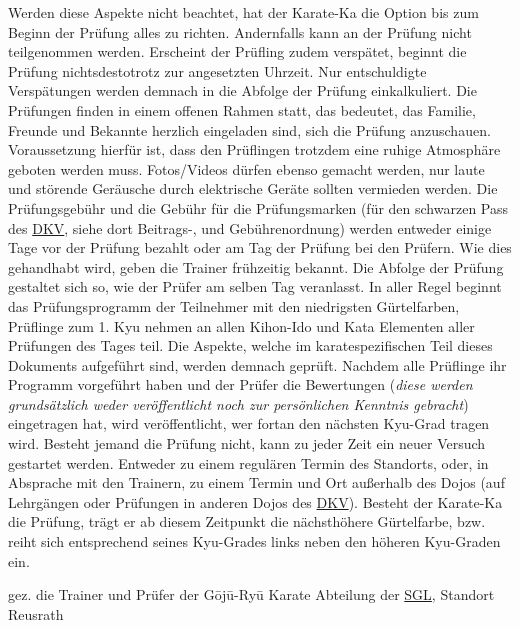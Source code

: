 		Werden diese Aspekte nicht beachtet, hat der Karate-Ka die Option bis zum Beginn der Prüfung alles zu richten. Andernfalls kann an der Prüfung nicht teilgenommen werden. Erscheint der Prüfling zudem verspätet, beginnt die Prüfung nichtsdestotrotz zur angesetzten Uhrzeit. Nur entschuldigte Verspätungen werden demnach in die Abfolge der Prüfung einkalkuliert.
	\vspace{4pt}\newline
		Die Prüfungen finden in einem offenen Rahmen statt, das bedeutet, das Familie, Freunde und Bekannte herzlich eingeladen sind, sich die Prüfung anzuschauen. Voraussetzung hierfür ist, dass den Prüflingen trotzdem eine ruhige Atmosphäre geboten werden muss. Fotos/Videos dürfen ebenso gemacht werden, nur laute und störende Geräusche durch elektrische Geräte sollten vermieden werden.
	\vspace{4pt}\newline
		Die Prüfungsgebühr und die Gebühr für die Prüfungsmarken (für den schwarzen Pass des \href{https://www.karate.de/}{DKV}, siehe dort Beitrags-, und Gebührenordnung) werden entweder einige Tage vor der Prüfung bezahlt oder am Tag der Prüfung bei den Prüfern. Wie dies gehandhabt wird, geben die Trainer frühzeitig bekannt. Die Abfolge der Prüfung gestaltet sich so, wie der Prüfer am selben Tag veranlasst. In aller Regel beginnt das Prüfungsprogramm der Teilnehmer mit den niedrigsten Gürtelfarben, Prüflinge zum 1. Kyu nehmen an allen Kihon-Ido und Kata Elementen aller Prüfungen des Tages teil. Die Aspekte, welche im karatespezifischen Teil dieses Dokuments aufgeführt sind, werden demnach geprüft. Nachdem alle Prüflinge ihr Programm vorgeführt haben und der Prüfer die Bewertungen (\textit{diese werden grundsätzlich weder veröffentlicht noch zur persönlichen Kenntnis gebracht}) eingetragen hat, wird veröffentlicht, wer fortan den nächsten Kyu-Grad tragen wird.
	\vspace{4pt}\newline
		Besteht jemand die Prüfung nicht, kann zu jeder Zeit ein neuer Versuch gestartet werden. Entweder zu einem regulären Termin des Standorts, oder, in Absprache mit den Trainern, zu einem Termin und Ort außerhalb des Dojos (auf Lehrgängen oder Prüfungen in anderen Dojos des \href{https://www.karate.de/}{DKV}).
	\vspace{4pt}\newline
		Besteht der Karate-Ka die Prüfung, trägt er ab diesem Zeitpunkt die nächsthöhere Gürtelfarbe, bzw. reiht sich entsprechend seines Kyu-Grades links neben den höheren Kyu-Graden ein.
	\vspace{4pt}\newline
		\begin{flushright}
			gez. die Trainer und Prüfer der G\={o}j\={u}-Ry\={u} Karate Abteilung der \href{https://www.sglangenfeld.de/}{SGL}, Standort Reusrath
		\end{flushright}
